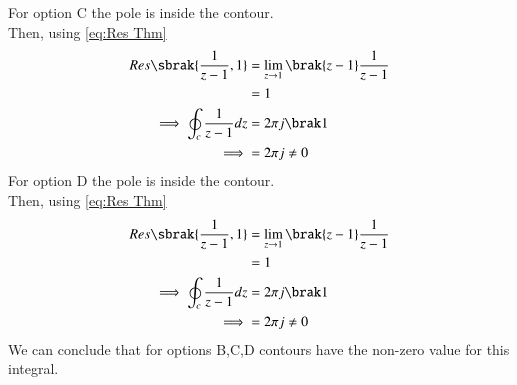 \documentclass[journal,12pt,twocolumn]{IEEEtran}
\theoremstyle{remark}
\begin{document}
For option C the pole is inside the contour.\\
Then, using \eqref{eq:Res Thm}
\begin{align}
Res\sbrak{\frac{1}{z-1},1} &=\lim_{z\to 1}\brak{z-1}\frac{1}{z-1}\\
&=1\\
\implies \oint_{c}\frac{1}{z-1}dz&=2\pi j\brak 1\\
\implies&=2\pi j\neq 0
\end{align}
For option D the pole is inside the contour.\\
Then, using \eqref{eq:Res Thm}
\begin{align}
Res\sbrak{\frac{1}{z-1},1} &=\lim_{z\to 1}\brak{z-1}\frac{1}{z-1}\\
&=1\\
\implies \oint_{c}\frac{1}{z-1}dz&=2\pi j\brak 1\\
\implies&=2\pi j\neq 0
\end{align}
We can conclude that for options B,C,D contours have the non-zero value for this integral.
\end{document}
